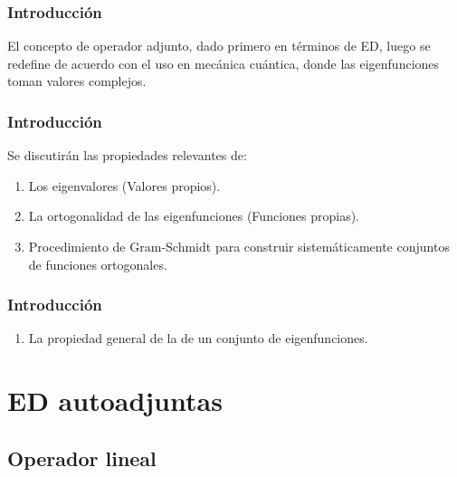 \documentclass[12pt]{beamer}
\begin{document}
\begin{frame}
\frametitle{Introducción}
El concepto de operador adjunto, dado primero en términos de ED, luego se redefine de acuerdo con el uso en mecánica cuántica, donde las eigenfunciones toman valores complejos.
\end{frame}
\begin{frame}
\frametitle{Introducción}
Se discutirán las propiedades relevantes de:
\pause
{}
\begin{enumerate}[<+->]
\item Los eigenvalores (Valores propios).
\item La ortogonalidad de las eigenfunciones (Funciones propias).
\item Procedimiento de Gram-Schmidt para construir sistemáticamente conjuntos de funciones ortogonales.
\seti
\end{enumerate}
\end{frame}
\begin{frame}
\frametitle{Introducción}
\begin{enumerate}[<+->]
\conti
\item La propiedad general de la  de un conjunto de eigenfunciones.
\end{enumerate}
\end{frame}

\section{ED autoadjuntas}
\subsection{Operador lineal}
\end{document}
